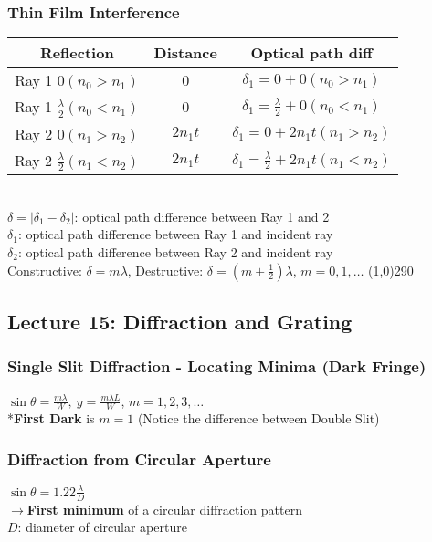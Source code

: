\documentclass[10 pt]{article}
\makeatletter
\newenvironment{tablehere}
  {\def\@captype{table}}
  {}
\makeatother
\begin{document}
\begin{multicols}{2}
\subsubsection*{Thin Film Interference}
\begin{tablehere}
\begin{tabular} {| c | c | c |}
\hline
\textbf{Reflection} & \textbf{Distance} & \textbf{Optical path diff}\\
\hline
Ray 1 $0(n_0 > n_1)$ 					&	0			&	$\delta_1 = 0+0 (n_0 > n_1)$ \\
Ray 1 $\frac{\lambda}{2}(n_0 < n_1)$ 	&	0			&	$\delta_1 = \frac{\lambda}{2}+0 (n_0 < n_1)$ \\
Ray 2 $0(n_1 > n_2)$ 					&	$2n_1 t$	&	$\delta_1 = 0+2n_1 t (n_1 > n_2)$ \\
Ray 2 $\frac{\lambda}{2}(n_1 < n_2)$ 	&	$2n_1 t$	&	$\delta_1 = \frac{\lambda}{2}+2n_1 t (n_1 < n_2)$ \\
\hline
\end{tabular}
\end{tablehere} \\
$\delta = | \delta_1 - \delta_2| $: optical path difference between Ray 1 and 2 \\
$\delta_1$: optical path difference between Ray 1 and incident ray \\
$\delta_2$: optical path difference between Ray 2 and incident ray \\
Constructive: $\delta = m\lambda$, Destructive: $\delta = (m+\frac{1}{2})\lambda$, $m=0,1,\ldots$
\line(1,0){290}

\subsection*{Lecture 15: Diffraction and Grating}
\subsubsection*{Single Slit Diffraction - Locating Minima (Dark Fringe)}
$\sin{\theta} = \frac{m\lambda}{W}, ~y = \frac{m\lambda L}{W}$, $m=1,2,3,\ldots$ \\
*\textbf{First Dark} is $m=1$ (Notice the difference between Double Slit)
\subsubsection*{Diffraction from Circular Aperture}
$\sin{\theta} = 1.22\frac{\lambda}{D}$ \\
$\rightarrow$\textbf{First minimum} of a circular diffraction pattern \\
$D$: diameter of circular aperture

\end{multicols}
\end{document}
